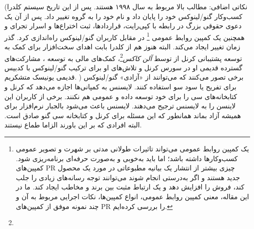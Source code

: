 (نکاتی اضافی: مطالب بالا مربوط به سال ۱۹۹۸ هستند. پس از این تاریخ سیستم کلدرا کسب‌وکار گنو/لینوکس
خود را پایان داد و نام خود را به گروه  تغییر داد. پس از آن یک دعوی حقوقی بزرگ در رابطه با
کپی‌رایت، قراردادها، ثبت اختراع‌ها و اسرار تجرای و همچنین یک کمپین روابط عمومی
\footnote{
یک کمپین روابط عمومی می‌تواند تاثیرات طولانی مدتی بر شهرت و تصویر عمومی کسب‌وکارها داشته باشد؛
اما باید به‌خوبی و به‌صورت حرفه‌ای برنامه‌ریزی شود. کمپین‌های PR چیزی بیشتر از انتشار یک بیانیه مطبوعاتی
در مورد یک محصول جدید هستند و اگر به‌درستی انجام شوند می‌توانند توجه رسانه‌های زیادی را جلب کند،
فروش را افزایش دهد و یک ارتباط مثبت بین برند و مخاطب ایجاد کند. ما در این مقاله، معنی کمپین روابط عمومی،
انواع کمپین‌ها، نکات اجرایی مربوط به آن و چند نمونه موفق از کمپین‌های PR را بررسی کرده‌ایم.
}
در مقابل کاربران گنو/لینوکس راه‌اندازی کرد. گذر زمان تغییر ایجاد می‌کند.
البته هنوز هم از کلدرا بابت اهدای سخت‌افزار برای کمک به توسعه پشتیبانی کرنل از  توسط
\emph{آلن کاکس}\footnote{}،
کمک‌های مالی به توسعه  ، مشارکت‌های گسترده قدیمی او در سورس کرنل و تلاش‌های او
برای ترکیب گنو/لینوکس با کدبیس قدیمی یونیسک متشکریم.
)
برخی تصور می‌کنند که می‌توانند از «آزادی» گنو/لینوکس برای تفریح یا سود سو استفاده کنند.
لایسنس  به کمپانی‌ها اجازه می‌دهد که کرنل و کتابخانه‌های سی را برای خود توسعه
داده و عمومی هم نکنند. برخی از کاربران این لاینسن را به لایسنس  ترجیح می‌دهند.
لایسنس  باعث می‌شود بالجبار نرم‌افزار برای همیشه آزاد بماند همانطور که این مسئله
برای کرنل و کتابخانه سی گنو صادق است. البته افرادی که بر این باورند الزاما طماع نیستند.



